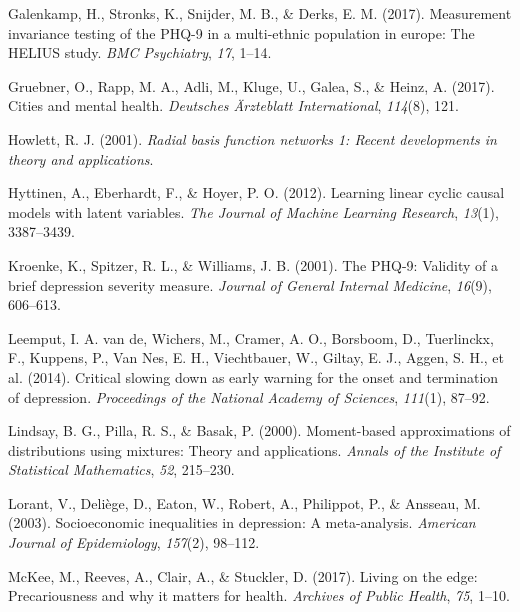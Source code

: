 \documentclass[
]{article}
\newlength{\cslhangindent}
\newenvironment{CSLReferences}[2] %
 {\begin{list}{}{%
  \setlength{\itemindent}{0pt}
  \setlength{\leftmargin}{0pt}
  \setlength{\parsep}{0pt}
  \ifodd #1
   \setlength{\leftmargin}{\cslhangindent}
   \setlength{\itemindent}{-1\cslhangindent}
  \fi
  \setlength{\itemsep}{#2\baselineskip}}}
 {\end{list}}
\begin{document}
\begin{CSLReferences}{1}{0}
Galenkamp, H., Stronks, K., Snijder, M. B., \& Derks, E. M. (2017).
Measurement invariance testing of the PHQ-9 in a multi-ethnic population
in europe: The HELIUS study. \emph{BMC Psychiatry}, \emph{17}, 1--14.

Gruebner, O., Rapp, M. A., Adli, M., Kluge, U., Galea, S., \& Heinz, A.
(2017). Cities and mental health. \emph{Deutsches {Ä}rzteblatt
International}, \emph{114}(8), 121.

Howlett, R. J. (2001). \emph{Radial basis function networks 1: Recent
developments in theory and applications}.

Hyttinen, A., Eberhardt, F., \& Hoyer, P. O. (2012). Learning linear
cyclic causal models with latent variables. \emph{The Journal of Machine
Learning Research}, \emph{13}(1), 3387--3439.

Kroenke, K., Spitzer, R. L., \& Williams, J. B. (2001). The PHQ-9:
Validity of a brief depression severity measure. \emph{Journal of
General Internal Medicine}, \emph{16}(9), 606--613.

Leemput, I. A. van de, Wichers, M., Cramer, A. O., Borsboom, D.,
Tuerlinckx, F., Kuppens, P., Van Nes, E. H., Viechtbauer, W., Giltay, E.
J., Aggen, S. H., et al. (2014). Critical slowing down as early warning
for the onset and termination of depression. \emph{Proceedings of the
National Academy of Sciences}, \emph{111}(1), 87--92.

Lindsay, B. G., Pilla, R. S., \& Basak, P. (2000). Moment-based
approximations of distributions using mixtures: Theory and applications.
\emph{Annals of the Institute of Statistical Mathematics}, \emph{52},
215--230.

Lorant, V., Deliège, D., Eaton, W., Robert, A., Philippot, P., \&
Ansseau, M. (2003). Socioeconomic inequalities in depression: A
meta-analysis. \emph{American Journal of Epidemiology}, \emph{157}(2),
98--112.

McKee, M., Reeves, A., Clair, A., \& Stuckler, D. (2017). Living on the
edge: Precariousness and why it matters for health. \emph{Archives of
Public Health}, \emph{75}, 1--10.


\end{CSLReferences}
\end{document}
